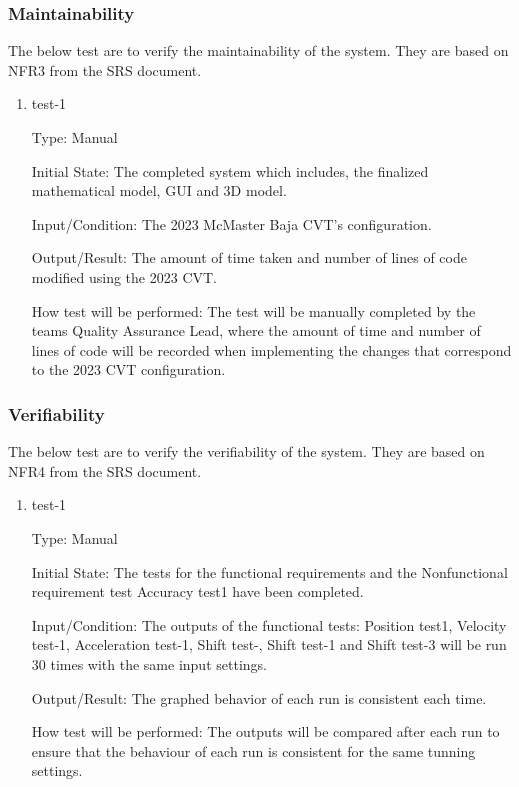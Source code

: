 \documentclass[12pt, titlepage]{article}
\begin{document}
\subsubsection{Maintainability}

The below test are to verify the maintainability of the system.
They are based on NFR3 from the SRS document.

\begin{enumerate}

\item{test-1\\}

Type: Manual
					
Initial State: The completed system which includes, the finalized mathematical model, GUI and 3D model.  
					
Input/Condition: The 2023 McMaster Baja CVT's configuration. 
					
Output/Result: The amount of time taken and number of lines of code modified using the 2023 CVT.
					
How test will be performed: The test will be manually completed by the teams Quality Assurance Lead, where the amount of time and number of lines of code will be recorded when implementing the changes that correspond to the 2023 CVT configuration.

\end{enumerate}

\subsubsection{Verifiability}

The below test are to verify the verifiability of the system.
They are based on NFR4 from the SRS document.

\begin{enumerate}

\item{test-1\\}

Type: Manual
					
Initial State: The tests for the functional requirements and the Nonfunctional requirement test Accuracy test1 have been completed.
					
Input/Condition: The outputs of the functional tests: Position test1, Velocity test-1, Acceleration test-1, Shift test-, Shift test-1 and Shift test-3 will be run 30 times with the same input settings. 
					
Output/Result: The graphed behavior of each run is consistent each time.
					
How test will be performed: The outputs will be compared after each run to ensure that the behaviour of each run is consistent for the same tunning settings.

\end{enumerate}
\end{document}
